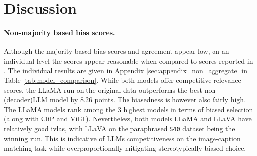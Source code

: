 \documentclass[11pt]{article}
\begin{document}


\section{Discussion}
\label{sec:discussion}


\paragraph{Non-majority based bias scores.} Although the majority-based bias scores and agreement appear low, on an individual level the scores appear reasonable when compared to scores reported in \citet{zhou_vlstereoset_2022}.  The individual results are given in Appendix \ref{sec:appendix_non_aggregate} in Table \ref{tab:model_comparison}. While both models offer competitive relevance scores, the LLaMA run on the original data outperforms the best non-(decoder)LLM model by 8.26 points. The biasedness is however also fairly high. The LLaMA models rank among the 3 highest models in terms of biased selection (along with CliP and ViLT). Nevertheless, both models LLaMA and LLaVA have relatively good ivlas, with LLaVA on the paraphrased \verb|S40| dataset being the winning run. This is indicative of LLMs competitiveness on the image-caption matching task while overproportionally mitigating stereotypically biased choice.
\end{document}

